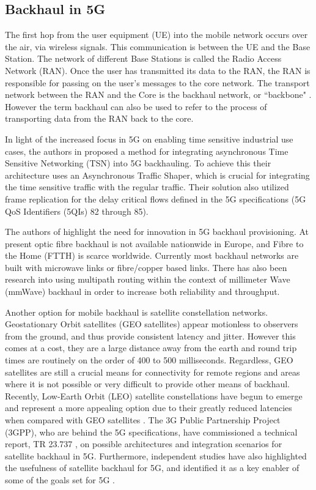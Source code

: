 \subsection{Backhaul in 5G}

The first hop from the user equipment (UE) into the mobile network occurs over the air, via wireless signals. This communication is between the UE and the Base Station. The network of different Base Stations is called the Radio Access Network (RAN). Once the user has transmitted its data to the RAN, the RAN is responsible for passing on the user's messages to the core network. The transport network between the RAN and the Core is the backhaul network, or “backbone" \cite{jaber20165g}. However the term backhaul can also be used to refer to the process of transporting data from the RAN back to the core.

In light of the increased focus in 5G on enabling time sensitive industrial use cases, the authors in \cite{prados2021asynchronous} proposed a method for integrating asynchronous Time Sensitive Networking (TSN) into 5G backhauling. To achieve this their architecture uses an Asynchronous Traffic Shaper, which is crucial for integrating the time sensitive traffic with the regular traffic. Their solution also utilized frame replication for the delay critical flows defined in the 5G specifications (5G QoS Identifiers (5QIs) 82 through 85).

The authors of \cite{jaber20165g} highlight the need for innovation in 5G backhaul provisioning. At present optic fibre backhaul is not available nationwide in Europe, and Fibre to the Home (FTTH) is scarce worldwide. Currently most backhaul networks are built with microwave links or fibre/copper based links. There has also been research \cite{seppanen2016multipath, saadat2018multipath} into using multipath routing within the context of millimeter Wave (mmWave) backhaul in order to increase both reliability and throughput.

Another option for mobile backhaul is satellite constellation networks. Geostationary Orbit satellites (GEO satellites) appear motionless to observers from the ground, and thus provide consistent latency and jitter. However this comes at a cost, they are a large distance away from the earth and round trip times are routinely on the order of 400 to 500 milliseconds. Regardless, GEO satellites are still a crucial means for connectivity for remote regions and areas where it is not possible or very difficult to provide other means of backhaul. Recently, Low-Earth Orbit (LEO) satellite constellations have begun to emerge and represent a more appealing option due to their greatly reduced latencies when compared with GEO satellites \cite{deutschmann2022broadband}. The 3G Public Partnership Project (3GPP), who are behind the 5G specifications, have commissioned a technical report, TR 23.737 \cite{3gpp.23.737}, on possible architectures and integration scenarios for satellite backhaul in 5G. Furthermore, independent studies have also highlighted the usefulness of satellite backhaul for 5G, and identified it as a key enabler of some of the goals set for 5G \cite{artiga2016terrestrial}.

